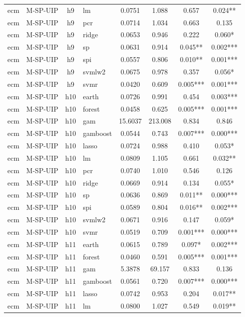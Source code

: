 \begin{ThreePartTable}
\begin{longtable}[t]{llclcccc}
ecm & M-SP-UIP & h9 & lm & 0.0751 & 1.088 & 0.657 & 0.024**\\
ecm & M-SP-UIP & h9 & pcr & 0.0714 & 1.034 & 0.663 & 0.135\\
ecm & M-SP-UIP & h9 & ridge & 0.0653 & 0.946 & 0.222 & 0.060*\\
ecm & M-SP-UIP & h9 & sp & 0.0631 & 0.914 & 0.045** & 0.002***\\
ecm & M-SP-UIP & h9 & spi & 0.0557 & 0.806 & 0.010** & 0.001***\\
ecm & M-SP-UIP & h9 & svmlw2 & 0.0675 & 0.978 & 0.357 & 0.056*\\
ecm & M-SP-UIP & h9 & svmr & 0.0420 & 0.609 & 0.005*** & 0.001***\\
\addlinespace
ecm & M-SP-UIP & h10 & earth & 0.0726 & 0.991 & 0.454 & 0.003***\\
ecm & M-SP-UIP & h10 & forest & 0.0458 & 0.625 & 0.005*** & 0.001***\\
ecm & M-SP-UIP & h10 & gam & 15.6037 & 213.008 & 0.834 & 0.846\\
ecm & M-SP-UIP & h10 & gamboost & 0.0544 & 0.743 & 0.007*** & 0.000***\\
ecm & M-SP-UIP & h10 & lasso & 0.0724 & 0.988 & 0.410 & 0.053*\\
ecm & M-SP-UIP & h10 & lm & 0.0809 & 1.105 & 0.661 & 0.032**\\
ecm & M-SP-UIP & h10 & pcr & 0.0740 & 1.010 & 0.546 & 0.126\\
ecm & M-SP-UIP & h10 & ridge & 0.0669 & 0.914 & 0.134 & 0.055*\\
ecm & M-SP-UIP & h10 & sp & 0.0636 & 0.869 & 0.011** & 0.000***\\
ecm & M-SP-UIP & h10 & spi & 0.0589 & 0.804 & 0.016** & 0.002***\\
ecm & M-SP-UIP & h10 & svmlw2 & 0.0671 & 0.916 & 0.147 & 0.059*\\
ecm & M-SP-UIP & h10 & svmr & 0.0519 & 0.709 & 0.001*** & 0.000***\\
\addlinespace
ecm & M-SP-UIP & h11 & earth & 0.0615 & 0.789 & 0.097* & 0.002***\\
ecm & M-SP-UIP & h11 & forest & 0.0460 & 0.591 & 0.005*** & 0.001***\\
ecm & M-SP-UIP & h11 & gam & 5.3878 & 69.157 & 0.833 & 0.136\\
ecm & M-SP-UIP & h11 & gamboost & 0.0561 & 0.720 & 0.007*** & 0.000***\\
ecm & M-SP-UIP & h11 & lasso & 0.0742 & 0.953 & 0.204 & 0.017**\\
ecm & M-SP-UIP & h11 & lm & 0.0800 & 1.027 & 0.549 & 0.019**\\

\end{longtable}
\end{ThreePartTable}
